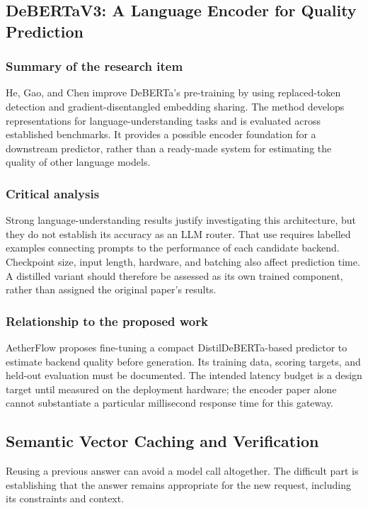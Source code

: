 \subsection{DeBERTaV3: A Language Encoder for Quality Prediction}
\subsubsection{Summary of the research item}
He, Gao, and Chen \cite{ref:DeBERTaV3} improve DeBERTa's pre-training by using replaced-token detection and gradient-disentangled embedding sharing. The method develops representations for language-understanding tasks and is evaluated across established benchmarks. It provides a possible encoder foundation for a downstream predictor, rather than a ready-made system for estimating the quality of other language models.

\subsubsection{Critical analysis}
Strong language-understanding results justify investigating this architecture, but they do not establish its accuracy as an LLM router. That use requires labelled examples connecting prompts to the performance of each candidate backend. Checkpoint size, input length, hardware, and batching also affect prediction time. A distilled variant should therefore be assessed as its own trained component, rather than assigned the original paper's results.

\subsubsection{Relationship to the proposed work}
AetherFlow proposes fine-tuning a compact DistilDeBERTa-based predictor to estimate backend quality before generation. Its training data, scoring targets, and held-out evaluation must be documented. The intended latency budget is a design target until measured on the deployment hardware; the encoder paper alone cannot substantiate a particular millisecond response time for this gateway.

\subsection*{Semantic Vector Caching and Verification}

Reusing a previous answer can avoid a model call altogether. The difficult part is establishing that the answer remains appropriate for the new request, including its constraints and context.

